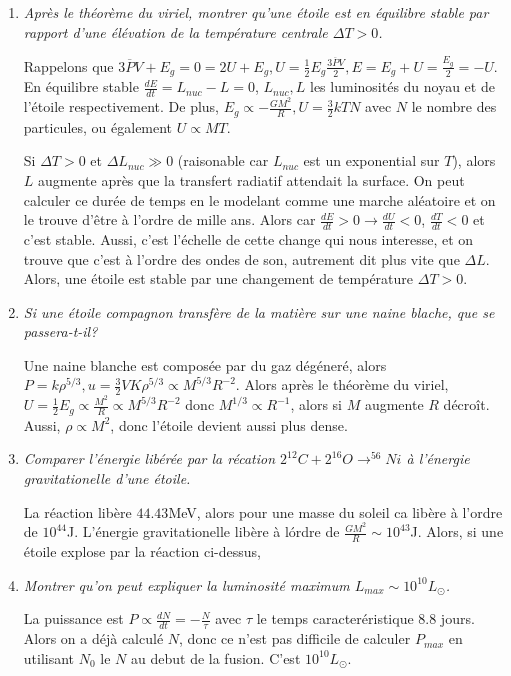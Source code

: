 \documentclass[10pt]{report}
\newcommand{\rd}[2]{\frac{d#1}{d#2}}
\begin{document}
\begin{enumerate}[1.]
    \item \emph{Apr\`es le th\'eor\`eme du viriel, montrer qu'une \'etoile est en \'equilibre stable par rapport d'une \'el\'evation de la temp\'erature centrale $\Delta T > 0$.}

        Rappelons que $3\overline{P}V + E_g = 0 = 2U + E_g, U = \frac{1}{2} E_g \frac{3\overline{P}V}{2}, E = E_g + U = \frac{E_g}{2} = -U$. En \'equilibre stable $\rd{E}{t} = L_{nuc} - L = 0$, $L_{nuc}, L$ les luminosit\'es du noyau et de l'\'etoile respectivement. De plus, $E_g \propto -\frac{GM^2}{R}, U = \frac{3}{2}kTN$ avec $N$ le nombre des particules, ou \'egalement $U \propto MT$.

        Si $\Delta T > 0$ et $\Delta L_{nuc} \gg 0$ (raisonable car $L_{nuc}$ est un exponential sur $T$), alors $L$ augmente apr\`es que la transfert radiatif attendait la surface. On peut calculer ce dur\'ee de temps en le modelant comme une marche al\'eatoire et on le trouve d'\^etre \`a l'ordre de mille ans. Alors car $\rd{E}{t} > 0 \to \rd{U}{t} < 0$, $\rd{T}{t} < 0$ et c'est stable. Aussi, c'est l'\'echelle de cette change qui nous interesse, et on trouve que c'est \`a l'ordre des ondes de son, autrement dit plus vite que $\Delta L$. Alors, une \'etoile est stable par une changement de temp\'erature $\Delta T > 0$. 

    \item \emph{Si une \'etoile compagnon transf\`ere de la mati\`ere sur une naine blache, que se passera-t-il?}

        Une naine blanche est compos\'ee par du gaz d\'eg\'ener\'e, alors $P = k\rho^{5/3}, u = \frac{3}{2}VK\rho^{5/3} \propto  M^{5/3}R^{-2}$. Alors apr\`es le th\'eor\`eme du viriel, $U = \frac{1}{2}E_g \propto \frac{M^2}{R} \propto M^{5/3}R^{-2}$ donc $M^{1/3} \propto R^{-1}$, alors si $M$ augmente $R$ d\'ecro\^it. Aussi, $\rho \propto M^{2}$, donc l'\'etoile devient aussi plus dense. 

    \item \emph{Comparer l'\'energie lib\'er\'ee par la r\'ecation $2^{12}C + 2^{16}O \to ^{56}Ni$ \`a l'\'energie gravitationelle d'une \'etoile.}

        La r\'eaction lib\`ere $44.43$MeV, alors pour une masse du soleil ca lib\`ere \`a l'ordre de $10^{44}$J. L'\'energie gravitationelle lib\`ere \`a l\'ordre de $\frac{GM^2}{R} \sim 10^{43}$J. Alors, si une \'etoile explose par la r\'eaction ci-dessus, 

    \item \emph{Montrer qu'on peut expliquer la luminosit\'e maximum $L_{max} \sim 10^{10}L_{\odot}$.}

        La puissance est $P \propto \rd{N}{t} = -\frac{N}{\tau}$ avec $\tau$ le temps caracter\'eristique $8.8$ jours. Alors on a d\'ej\`a calcul\'e $N$, donc ce n'est pas difficile de calculer $P_{max}$ en utilisant $N_0$ le $N$ au debut de la fusion. C'est $10^{10}L_{\odot}$. 
\end{enumerate}
\end{document}
